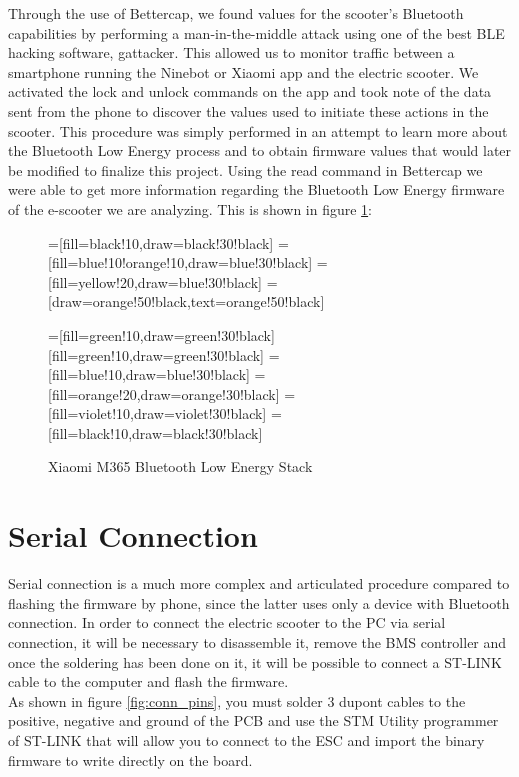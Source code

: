 \documentclass[binding=0.6cm,LaM,noexaminfo]{sapthesis}
\begin{document}
\noindent Through the use of Bettercap, we found values for the scooter's Bluetooth capabilities by performing a man-in-the-middle attack using one of the best BLE hacking software, gattacker. This allowed us to monitor traffic between a smartphone running the Ninebot or Xiaomi app and the electric scooter. We activated the lock and unlock commands on the app and took note of the data sent from the phone to discover the values used to initiate these actions in the scooter. This procedure was simply performed in an attempt to learn more about the Bluetooth Low Energy process and to obtain firmware values that would later be modified to finalize this project. Using the read command in Bettercap we were able to get more information regarding the Bluetooth Low Energy firmware of the e-scooter we are analyzing. This is shown in figure \ref{fig:m365_ble_stack}:

\begin{figure}[!htp]
=[fill=black!10,draw=black!30!black]
=[fill=blue!10!orange!10,draw=blue!30!black]
=[fill=yellow!20,draw=blue!30!black]
=[draw=orange!50!black,text=orange!50!black]
    \centering
\begin{drawstack}
=[fill=green!10,draw=green!30!black]
  [fill=green!10,draw=green!30!black] 
  =[fill=blue!10,draw=blue!30!black]
      
  =[fill=orange!20,draw=orange!30!black]
      
  =[fill=violet!10,draw=violet!30!black]
     
  =[fill=black!10,draw=black!30!black]
\end{drawstack}

\caption{Xiaomi M365 Bluetooth Low Energy Stack}
    \label{fig:m365_ble_stack}
\end{figure}



\newpage
\section{Serial Connection}
Serial connection is a much more complex and articulated procedure compared to flashing the firmware by phone, since the latter uses only a device with Bluetooth connection. In order to connect the electric scooter to the PC via serial connection, it will be necessary to disassemble it, remove the BMS controller and once the soldering has been done on it, it will be possible to connect a ST-LINK cable to the computer and flash the firmware.\\
As shown in figure \ref{fig:conn_pins}, you must solder 3 dupont cables to the positive, negative and ground of the PCB and use the STM Utility programmer of ST-LINK that will allow you to connect to the ESC and import the binary firmware to write directly on the board.
\end{document}
